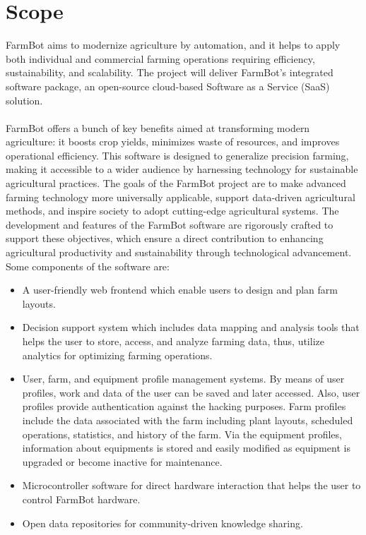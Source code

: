 \section{Scope}
FarmBot aims to modernize agriculture by automation, and it helps to apply both individual and commercial farming operations requiring efficiency, sustainability, and scalability. The project will deliver FarmBot's integrated software package, an open-source cloud-based Software as a Service (SaaS) solution. \\\\
FarmBot offers a bunch of key benefits aimed at transforming modern agriculture: it boosts crop yields, minimizes waste of resources, and improves operational efficiency. This software is designed to generalize precision farming, making it accessible to a wider audience by harnessing technology for sustainable agricultural practices. The goals of the FarmBot project are to make advanced farming technology more universally applicable, support data-driven agricultural methods, and inspire society to adopt cutting-edge agricultural systems. The development and features of the FarmBot software are rigorously crafted to support these objectives, which ensure a direct contribution to enhancing agricultural productivity and sustainability through technological advancement. Some components of the software are:

\begin{itemize}
    \item A user-friendly web frontend which enable users to design and plan farm layouts.
    \item Decision support system which includes data mapping and analysis tools that helps the user to store, access, and analyze farming data, thus, utilize analytics for optimizing farming operations.
    \item User, farm, and equipment profile management systems. By means of user profiles, work and data of the user can be saved and later accessed. Also, user profiles provide authentication against the hacking purposes. Farm profiles include the data associated with the farm including plant layouts, scheduled operations, statistics, and history of the farm. Via the equipment profiles, information about equipments is stored and easily modified as equipment is upgraded or become inactive for maintenance.
    \item Microcontroller software for direct hardware interaction that helps the user to control FarmBot hardware.
    \item Open data repositories for community-driven knowledge sharing.
\end{itemize}

